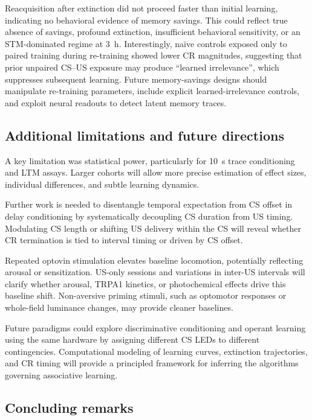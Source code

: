 Reacquisition after extinction did not proceed faster than initial learning, indicating no behavioral evidence of memory savings. This could reflect true absence of savings, profound extinction, insufficient behavioral sensitivity, or an STM-dominated regime at \SI{3}{\hour}. Interestingly, na\"ive controls exposed only to paired training during re-training showed lower CR magnitudes, suggesting that prior unpaired CS--US exposure may produce \enquote{learned irrelevance}, which suppresses subsequent learning. Future memory-savings designs should manipulate re-training parameters, include explicit learned-irrelevance controls, and exploit neural readouts to detect latent memory traces.

\subsection{Additional limitations and future directions}

A key limitation was statistical power, particularly for 10~s trace conditioning and LTM assays. Larger cohorts will allow more precise estimation of effect sizes, individual differences, and subtle learning dynamics.

Further work is needed to disentangle temporal expectation from CS offset in delay conditioning by systematically decoupling CS duration from US timing. Modulating CS length or shifting US delivery within the CS will reveal whether CR termination is tied to interval timing or driven by CS offset.

Repeated optovin stimulation elevates baseline locomotion, potentially reflecting arousal or sensitization. US-only sessions and variations in inter-US intervals will clarify whether arousal, TRPA1 kinetics, or photochemical effects drive this baseline shift. Non-aversive priming stimuli, such as optomotor responses or whole-field luminance changes, may provide cleaner baselines.

Future paradigms could explore discriminative conditioning and operant learning using the same hardware by assigning different CS LEDs to different contingencies. Computational modeling of learning curves, extinction trajectories, and CR timing will provide a principled framework for inferring the algorithms governing associative learning.

\subsection{Concluding remarks}

